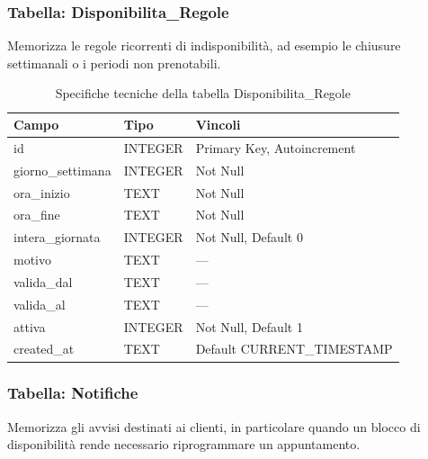 \documentclass[12pt,a4paper]{article}
\begin{document}
\newpage

\subsubsection{Tabella: Disponibilita\_Regole}
Memorizza le regole ricorrenti di indisponibilità, ad esempio le chiusure settimanali o i periodi non prenotabili.

\begin{table}[h!]
\centering
\vspace{0.4cm}
\begin{tabular}{lll}
    \toprule
    \textbf{Campo} & \textbf{Tipo} & \textbf{Vincoli} \\
    \midrule
    id                  & INTEGER & Primary Key, Autoincrement \\
    giorno\_settimana   & INTEGER & Not Null \\
    ora\_inizio         & TEXT    & Not Null \\
    ora\_fine           & TEXT    & Not Null \\
    intera\_giornata    & INTEGER & Not Null, Default 0 \\
    motivo              & TEXT    & --- \\
    valida\_dal         & TEXT    & --- \\
    valida\_al          & TEXT    & --- \\
    attiva              & INTEGER & Not Null, Default 1 \\
    created\_at         & TEXT    & Default CURRENT\_TIMESTAMP \\
    \bottomrule
\end{tabular}
\caption{Specifiche tecniche della tabella Disponibilita\_Regole}
\end{table}


\subsubsection{Tabella: Notifiche}
Memorizza gli avvisi destinati ai clienti, in particolare quando un blocco di disponibilità rende necessario riprogrammare un appuntamento.
\end{document}
